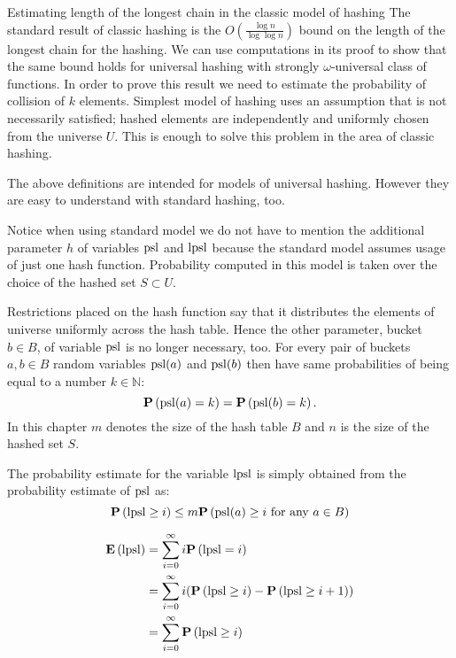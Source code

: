 \begin{section}{Estimating length of the longest chain in the classic model of hashing}
The standard result of classic hashing is the $O\left(\frac{\log n}{\log \log n}\right)$ bound on the length of the longest chain for the hashing. We can use computations in its proof to show that the same bound holds for universal hashing with strongly $\omega$-universal class of functions. In order to prove this result we need to estimate the probability of collision of $k$ elements. Simplest model of hashing uses an assumption that is not necessarily satisfied; hashed elements are independently and uniformly chosen from the universe $U$. This is enough to solve this problem in the area of classic hashing. 

The above definitions are intended for models of universal hashing. However they are easy to understand with standard hashing, too. 

Notice when using standard model we do not have to mention the additional parameter $h$ of variables $\mathrm{psl}$ and $\mathrm{lpsl}$ because the standard model assumes usage of just one hash function. Probability computed in this model is taken over the choice of the hashed set $S \subset U$. 

Restrictions placed on the hash function say that it distributes the elements of universe uniformly across the hash table. Hence the other parameter, bucket $b \in B$, of variable $\mathrm{psl}$ is no longer necessary, too. For every pair of buckets $a, b \in B$ random variables $\mathrm{psl}(a)$ and $\mathrm{psl}(b)$ then have same probabilities of being equal to a number $k \in \mathbb{N}$: \[\mathbf{P}\left(\mathrm{psl}(a) = k\right) = \mathbf{P}\left(\mathrm{psl}(b) = k\right) \text{.}\] In this chapter $m$ denotes the size of the hash table $B$ and $n$ is the size of the hashed set $S$.

The probability estimate for the variable $\mathrm{lpsl}$ is simply obtained from the probability estimate of $\mathrm{psl}$ as:
\begin{displaymath}
\mathbf{P}\left(\mathrm{lpsl} \geq i\right) \leq m \mathbf{P}\left(\mathrm{psl}(a) \geq i \text{ for any } a \in B\right)
\end{displaymath}

\begin{displaymath}
\begin{split}
\mathbf{E}\left(\mathrm{lpsl}\right)
	& = \displaystyle \sum_{i=0}^{\infty} i \mathbf{P}\left(\mathrm{lpsl} = i\right) \\
	& = \displaystyle \sum_{i = 0}^{\infty} i (\mathbf{P}\left(\mathrm{lpsl} \geq i\right) - \mathbf{P}\left(\mathrm{lpsl} \geq i + 1\right)) \\ 
	& = \displaystyle \sum_{i = 0}^{\infty} \mathbf{P}\left(\mathrm{lpsl} \geq i\right)
\end{split}
\end{displaymath}


\end{section}
